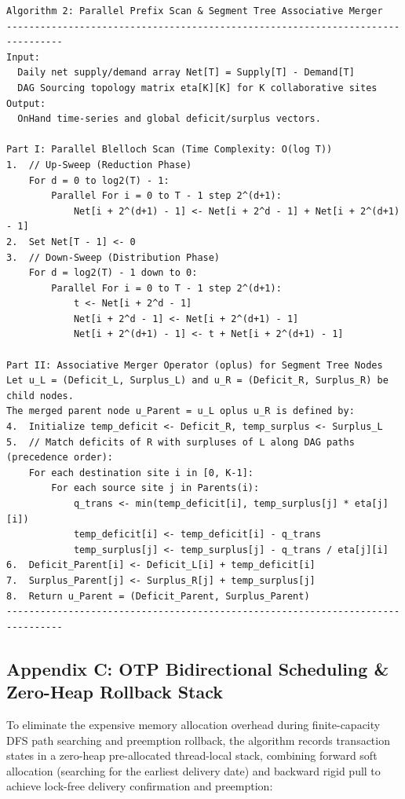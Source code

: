 \documentclass[11pt,a4paper]{article}
\begin{document}
\begin{verbatim}
Algorithm 2: Parallel Prefix Scan & Segment Tree Associative Merger
--------------------------------------------------------------------------------
Input:
  Daily net supply/demand array Net[T] = Supply[T] - Demand[T]
  DAG Sourcing topology matrix eta[K][K] for K collaborative sites
Output:
  OnHand time-series and global deficit/surplus vectors.

Part I: Parallel Blelloch Scan (Time Complexity: O(log T))
1.  // Up-Sweep (Reduction Phase)
    For d = 0 to log2(T) - 1:
        Parallel For i = 0 to T - 1 step 2^(d+1):
            Net[i + 2^(d+1) - 1] <- Net[i + 2^d - 1] + Net[i + 2^(d+1) - 1]
2.  Set Net[T - 1] <- 0
3.  // Down-Sweep (Distribution Phase)
    For d = log2(T) - 1 down to 0:
        Parallel For i = 0 to T - 1 step 2^(d+1):
            t <- Net[i + 2^d - 1]
            Net[i + 2^d - 1] <- Net[i + 2^(d+1) - 1]
            Net[i + 2^(d+1) - 1] <- t + Net[i + 2^(d+1) - 1]

Part II: Associative Merger Operator (oplus) for Segment Tree Nodes
Let u_L = (Deficit_L, Surplus_L) and u_R = (Deficit_R, Surplus_R) be child nodes.
The merged parent node u_Parent = u_L oplus u_R is defined by:
4.  Initialize temp_deficit <- Deficit_R, temp_surplus <- Surplus_L
5.  // Match deficits of R with surpluses of L along DAG paths (precedence order):
    For each destination site i in [0, K-1]:
        For each source site j in Parents(i):
            q_trans <- min(temp_deficit[i], temp_surplus[j] * eta[j][i])
            temp_deficit[i] <- temp_deficit[i] - q_trans
            temp_surplus[j] <- temp_surplus[j] - q_trans / eta[j][i]
6.  Deficit_Parent[i] <- Deficit_L[i] + temp_deficit[i]
7.  Surplus_Parent[j] <- Surplus_R[j] + temp_surplus[j]
8.  Return u_Parent = (Deficit_Parent, Surplus_Parent)
--------------------------------------------------------------------------------
\end{verbatim}

\subsection*{Appendix C: OTP Bidirectional Scheduling \& Zero-Heap Rollback Stack}

To eliminate the expensive memory allocation overhead during finite-capacity DFS path searching and preemption rollback, the algorithm records transaction states in a zero-heap pre-allocated thread-local stack, combining forward soft allocation (searching for the earliest delivery date) and backward rigid pull to achieve lock-free delivery confirmation and preemption:
\end{document}
